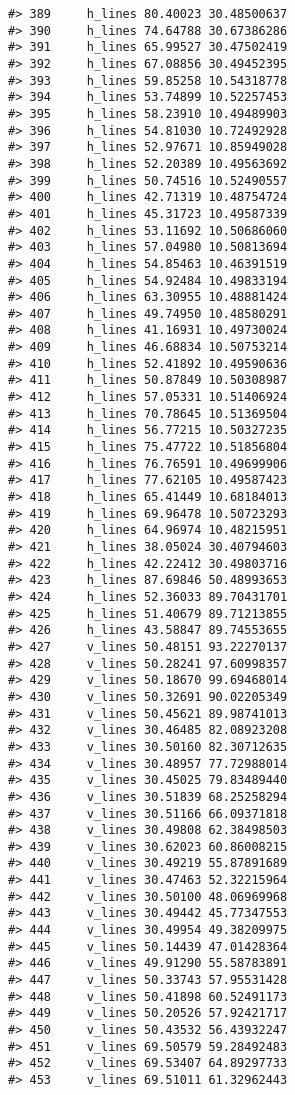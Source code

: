 \documentclass[
]{book}
\theoremstyle{definition}
\theoremstyle{definition}
\theoremstyle{definition}
\theoremstyle{definition}
\theoremstyle{remark}
\begin{document}
\begin{verbatim}
#> 389     h_lines 80.40023 30.48500637
#> 390     h_lines 74.64788 30.67386286
#> 391     h_lines 65.99527 30.47502419
#> 392     h_lines 67.08856 30.49452395
#> 393     h_lines 59.85258 10.54318778
#> 394     h_lines 53.74899 10.52257453
#> 395     h_lines 58.23910 10.49489903
#> 396     h_lines 54.81030 10.72492928
#> 397     h_lines 52.97671 10.85949028
#> 398     h_lines 52.20389 10.49563692
#> 399     h_lines 50.74516 10.52490557
#> 400     h_lines 42.71319 10.48754724
#> 401     h_lines 45.31723 10.49587339
#> 402     h_lines 53.11692 10.50686060
#> 403     h_lines 57.04980 10.50813694
#> 404     h_lines 54.85463 10.46391519
#> 405     h_lines 54.92484 10.49833194
#> 406     h_lines 63.30955 10.48881424
#> 407     h_lines 49.74950 10.48580291
#> 408     h_lines 41.16931 10.49730024
#> 409     h_lines 46.68834 10.50753214
#> 410     h_lines 52.41892 10.49590636
#> 411     h_lines 50.87849 10.50308987
#> 412     h_lines 57.05331 10.51406924
#> 413     h_lines 70.78645 10.51369504
#> 414     h_lines 56.77215 10.50327235
#> 415     h_lines 75.47722 10.51856804
#> 416     h_lines 76.76591 10.49699906
#> 417     h_lines 77.62105 10.49587423
#> 418     h_lines 65.41449 10.68184013
#> 419     h_lines 69.96478 10.50723293
#> 420     h_lines 64.96974 10.48215951
#> 421     h_lines 38.05024 30.40794603
#> 422     h_lines 42.22412 30.49803716
#> 423     h_lines 87.69846 50.48993653
#> 424     h_lines 52.36033 89.70431701
#> 425     h_lines 51.40679 89.71213855
#> 426     h_lines 43.58847 89.74553655
#> 427     v_lines 50.48151 93.22270137
#> 428     v_lines 50.28241 97.60998357
#> 429     v_lines 50.18670 99.69468014
#> 430     v_lines 50.32691 90.02205349
#> 431     v_lines 50.45621 89.98741013
#> 432     v_lines 30.46485 82.08923208
#> 433     v_lines 30.50160 82.30712635
#> 434     v_lines 30.48957 77.72988014
#> 435     v_lines 30.45025 79.83489440
#> 436     v_lines 30.51839 68.25258294
#> 437     v_lines 30.51166 66.09371818
#> 438     v_lines 30.49808 62.38498503
#> 439     v_lines 30.62023 60.86008215
#> 440     v_lines 30.49219 55.87891689
#> 441     v_lines 30.47463 52.32215964
#> 442     v_lines 30.50100 48.06969968
#> 443     v_lines 30.49442 45.77347553
#> 444     v_lines 30.49954 49.38209975
#> 445     v_lines 50.14439 47.01428364
#> 446     v_lines 49.91290 55.58783891
#> 447     v_lines 50.33743 57.95531428
#> 448     v_lines 50.41898 60.52491173
#> 449     v_lines 50.20526 57.92421717
#> 450     v_lines 50.43532 56.43932247
#> 451     v_lines 69.50579 59.28492483
#> 452     v_lines 69.53407 64.89297733
#> 453     v_lines 69.51011 61.32962443

\end{verbatim}
\end{document}
